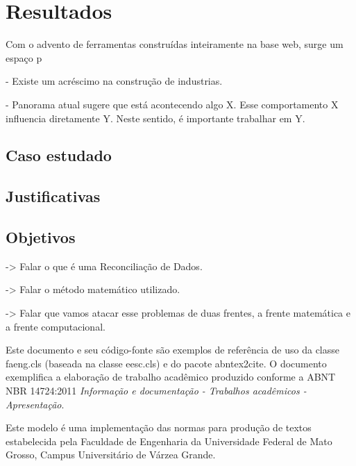 \chapter[Resultados]{Resultados}

Com o advento de ferramentas construídas inteiramente na base web, surge um espaço p


- Existe um acréscimo na construção de industrias.


- Panorama atual sugere que está acontecendo algo X. Esse comportamento X influencia diretamente Y. Neste sentido, é importante trabalhar em Y.


\section{Caso estudado}


\section{Justificativas}


\section{Objetivos}

-> Falar o que é uma Reconciliação de Dados.

-> Falar o método matemático utilizado.

-> Falar que vamos atacar esse problemas de duas frentes, a frente matemática e a frente computacional.

Este documento e seu código-fonte são exemplos de referência de uso da classe \textsf{faeng.cls} (baseada na classe \textsf{eesc.cls}) e do pacote \textsf{abntex2cite}. O documento exemplifica a elaboração de trabalho acadêmico produzido conforme a \ac{ABNT} \ac{NBR} 14724:2011 \emph{Informação e documentação - Trabalhos acadêmicos - Apresentação}.

Este modelo é uma implementação das normas para produção de textos estabelecida pela Faculdade de Engenharia da Universidade Federal de Mato Grosso, Campus Universitário de Várzea Grande.